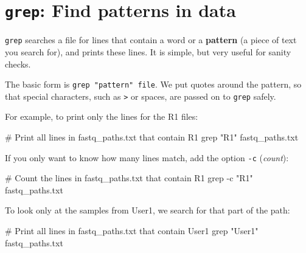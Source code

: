 \documentclass[
  letterpaper,
  DIV=11,
  numbers=noendperiod]{scrreprt}
\newenvironment{Shaded}{}{}
\newcommand{\AttributeTok}[1]{\textcolor[rgb]{0.84,0.23,0.29}{#1}}
\newcommand{\CommentTok}[1]{\textcolor[rgb]{0.42,0.45,0.49}{#1}}
\newcommand{\FunctionTok}[1]{\textcolor[rgb]{0.44,0.26,0.76}{#1}}
\newcommand{\NormalTok}[1]{\textcolor[rgb]{0.14,0.16,0.18}{#1}}
\newcommand{\StringTok}[1]{\textcolor[rgb]{0.01,0.18,0.38}{#1}}
\begin{document}
\section{\texorpdfstring{\texttt{grep}: Find patterns in
data}{grep: Find patterns in data}}\label{grep-find-patterns-in-data}

\texttt{grep} searches a file for lines that contain a word or a
\textbf{pattern} (a piece of text you search for), and prints these
lines. It is simple, but very useful for sanity checks.

The basic form is \texttt{grep\ "pattern"\ file}. We put quotes around
the pattern, so that special characters, such as \texttt{\textgreater{}}
or spaces, are passed on to \texttt{grep} safely.

For example, to print only the lines for the R1 files:

\begin{Shaded}
\begin{Highlighting}[]
\CommentTok{\# Print all lines in fastq\_paths.txt that contain R1}
\FunctionTok{grep} \StringTok{"R1"}\NormalTok{ fastq\_paths.txt}
\end{Highlighting}
\end{Shaded}

If you only want to know how many lines match, add the option
\texttt{-c} (\emph{count}):

\begin{Shaded}
\begin{Highlighting}[]
\CommentTok{\# Count the lines in fastq\_paths.txt that contain R1}
\FunctionTok{grep} \AttributeTok{{-}c} \StringTok{"R1"}\NormalTok{ fastq\_paths.txt}
\end{Highlighting}
\end{Shaded}

To look only at the samples from User1, we search for that part of the
path:

\begin{Shaded}
\begin{Highlighting}[]
\CommentTok{\# Print all lines in fastq\_paths.txt that contain User1}
\FunctionTok{grep} \StringTok{"User1"}\NormalTok{ fastq\_paths.txt}
\end{Highlighting}
\end{Shaded}
\end{document}
